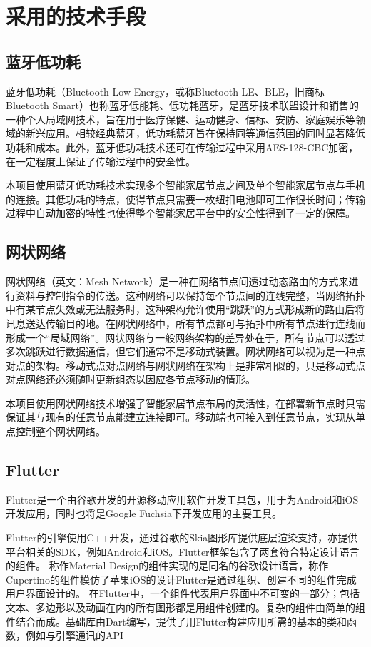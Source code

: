 \chapter{采用的技术手段}

\section{蓝牙低功耗}
蓝牙低功耗（Bluetooth Low Energy，或称Bluetooth LE、BLE，旧商标Bluetooth Smart）也称蓝牙低能耗、低功耗蓝牙，是蓝牙技术联盟设计和销售的一种个人局域网技术，旨在用于医疗保健、运动健身、信标、安防、家庭娱乐等领域的新兴应用。相较经典蓝牙，低功耗蓝牙旨在保持同等通信范围的同时显著降低功耗和成本。\cite{ble}此外，蓝牙低功耗技术还可在传输过程中采用AES-128-CBC加密，在一定程度上保证了传输过程中的安全性。

本项目使用蓝牙低功耗技术实现多个智能家居节点之间及单个智能家居节点与手机的连接。其低功耗的特点，使得节点只需要一枚纽扣电池即可工作很长时间；传输过程中自动加密的特性也使得整个智能家居平台中的安全性得到了一定的保障。

\section{网状网络}
网状网络（英文：Mesh Network）是一种在网络节点间透过动态路由的方式来进行资料与控制指令的传送。这种网络可以保持每个节点间的连线完整，当网络拓扑中有某节点失效或无法服务时，这种架构允许使用“跳跃”的方式形成新的路由后将讯息送达传输目的地。在网状网络中，所有节点都可与拓扑中所有节点进行连线而形成一个“局域网络”。网状网络与一般网络架构的差异处在于，所有节点可以透过多次跳跃进行数据通信，但它们通常不是移动式装置。网状网络可以视为是一种点对点的架构。移动式点对点网络与网状网络在架构上是非常相似的，只是移动式点对点网络还必须随时更新组态以因应各节点移动的情形。\cite{mesh}

本项目使用网状网络技术增强了智能家居节点布局的灵活性，在部署新节点时只需保证其与现有的任意节点能建立连接即可。移动端也可接入到任意节点，实现从单点控制整个网状网络。

\section{Flutter}
Flutter是一个由谷歌开发的开源移动应用软件开发工具包，用于为Android和iOS开发应用，同时也将是Google Fuchsia下开发应用的主要工具。

Flutter的引擎使用C++开发，通过谷歌的Skia图形库提供底层渲染支持，亦提供平台相关的SDK，例如Android和iOS。Flutter框架包含了两套符合特定设计语言的组件。 称作Material Design的组件实现的是同名的谷歌设计语言，称作Cupertino的组件模仿了苹果iOS的设计Flutter是通过组织、创建不同的组件完成用户界面设计的。 在Flutter中，一个组件代表用户界面中不可变的一部分；包括文本、多边形以及动画在内的所有图形都是用组件创建的。复杂的组件由简单的组件结合而成。基础库由Dart编写，提供了用Flutter构建应用所需的基本的类和函数，例如与引擎通讯的API

